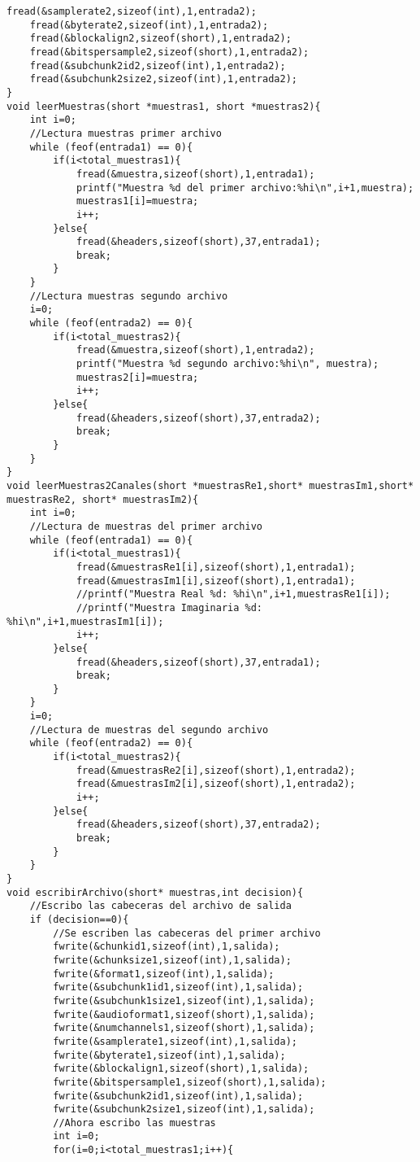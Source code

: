 \begin{lstlisting}[style=CStyle]
	fread(&samplerate2,sizeof(int),1,entrada2);
	fread(&byterate2,sizeof(int),1,entrada2);
	fread(&blockalign2,sizeof(short),1,entrada2);
	fread(&bitspersample2,sizeof(short),1,entrada2);
	fread(&subchunk2id2,sizeof(int),1,entrada2);
	fread(&subchunk2size2,sizeof(int),1,entrada2);
}
void leerMuestras(short *muestras1, short *muestras2){
	int i=0;
	//Lectura muestras primer archivo
	while (feof(entrada1) == 0){
		if(i<total_muestras1){
			fread(&muestra,sizeof(short),1,entrada1);
			printf("Muestra %d del primer archivo:%hi\n",i+1,muestra);
			muestras1[i]=muestra;
			i++;
		}else{
			fread(&headers,sizeof(short),37,entrada1);
			break;
		}
	}
	//Lectura muestras segundo archivo
	i=0;
	while (feof(entrada2) == 0){
		if(i<total_muestras2){
			fread(&muestra,sizeof(short),1,entrada2);
			printf("Muestra %d segundo archivo:%hi\n", muestra);
			muestras2[i]=muestra;
			i++;
		}else{
			fread(&headers,sizeof(short),37,entrada2);
			break;
		}
	}
}
void leerMuestras2Canales(short *muestrasRe1,short* muestrasIm1,short* muestrasRe2, short* muestrasIm2){
	int i=0;
	//Lectura de muestras del primer archivo
	while (feof(entrada1) == 0){
		if(i<total_muestras1){
			fread(&muestrasRe1[i],sizeof(short),1,entrada1);
			fread(&muestrasIm1[i],sizeof(short),1,entrada1);
			//printf("Muestra Real %d: %hi\n",i+1,muestrasRe1[i]);
			//printf("Muestra Imaginaria %d: %hi\n",i+1,muestrasIm1[i]);
			i++;		
		}else{
			fread(&headers,sizeof(short),37,entrada1);
			break;
		}
	}
	i=0;
	//Lectura de muestras del segundo archivo
	while (feof(entrada2) == 0){
		if(i<total_muestras2){
			fread(&muestrasRe2[i],sizeof(short),1,entrada2);
			fread(&muestrasIm2[i],sizeof(short),1,entrada2);
			i++;
		}else{
			fread(&headers,sizeof(short),37,entrada2);
			break;
		}
	}
}
void escribirArchivo(short* muestras,int decision){
	//Escribo las cabeceras del archivo de salida
	if (decision==0){
		//Se escriben las cabeceras del primer archivo
		fwrite(&chunkid1,sizeof(int),1,salida);
		fwrite(&chunksize1,sizeof(int),1,salida);
		fwrite(&format1,sizeof(int),1,salida);
		fwrite(&subchunk1id1,sizeof(int),1,salida);
		fwrite(&subchunk1size1,sizeof(int),1,salida);
		fwrite(&audioformat1,sizeof(short),1,salida);
		fwrite(&numchannels1,sizeof(short),1,salida);
		fwrite(&samplerate1,sizeof(int),1,salida);
		fwrite(&byterate1,sizeof(int),1,salida);
		fwrite(&blockalign1,sizeof(short),1,salida);
		fwrite(&bitspersample1,sizeof(short),1,salida);
		fwrite(&subchunk2id1,sizeof(int),1,salida);
		fwrite(&subchunk2size1,sizeof(int),1,salida);
		//Ahora escribo las muestras
		int i=0;
		for(i=0;i<total_muestras1;i++){

\end{lstlisting}
